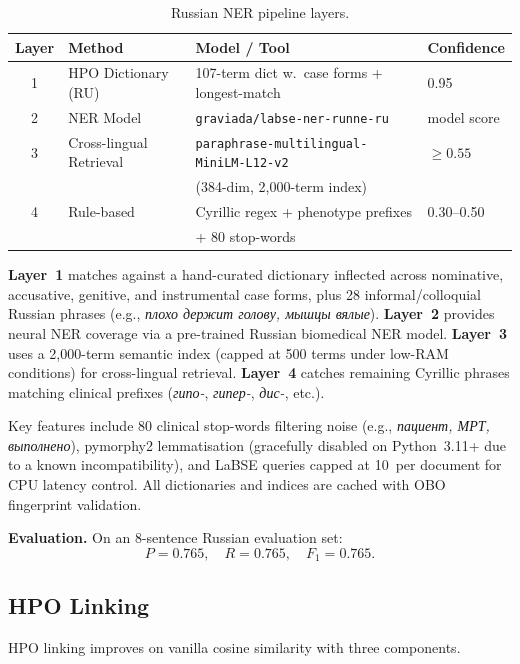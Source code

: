\documentclass[11pt,a4paper]{article}
\begin{document}
\begin{table}[H]
\centering
\caption{Russian NER pipeline layers.}
\label{tab:runerlayers}
\begin{tabular}{clll}
\toprule
\textbf{Layer} & \textbf{Method} & \textbf{Model / Tool} & \textbf{Confidence} \\
\midrule
1 & HPO Dictionary (RU) & 107-term dict w.\ case forms + longest-match & 0.95 \\
2 & NER Model & \texttt{graviada/labse-ner-runne-ru} & model score \\
3 & Cross-lingual Retrieval & \texttt{paraphrase-multilingual-MiniLM-L12-v2} & $\geq 0.55$ \\
  &                          & (384-dim, 2{,}000-term index) & \\
4 & Rule-based & Cyrillic regex + phenotype prefixes & 0.30--0.50 \\
  &            & + 80 stop-words & \\
\bottomrule
\end{tabular}
\end{table}

\textbf{Layer~1} matches against a hand-curated dictionary inflected across
nominative, accusative, genitive, and instrumental case forms, plus 28
informal/colloquial Russian phrases (e.g.,
\textit{плохо держит голову, мышцы вялые}).
\textbf{Layer~2} provides neural NER coverage via a pre-trained Russian
biomedical NER model.
\textbf{Layer~3} uses a 2{,}000-term semantic index (capped at 500 terms under
low-RAM conditions) for cross-lingual retrieval.
\textbf{Layer~4} catches remaining Cyrillic phrases matching clinical prefixes
(\textit{гипо-}, \textit{гипер-}, \textit{дис-}, etc.).

Key features include 80 clinical stop-words filtering noise (e.g.,
\textit{пациент, МРТ, выполнено}), pymorphy2 lemmatisation (gracefully disabled
on Python~3.11+ due to a known incompatibility), and LaBSE queries capped at
10~per document for CPU latency control.  All dictionaries and indices are
cached with OBO fingerprint validation.

\textbf{Evaluation.}  On an 8-sentence Russian evaluation set:
\[
  P = 0.765, \quad R = 0.765, \quad F_1 = 0.765.
\]

\subsection{HPO Linking}

HPO linking improves on vanilla cosine similarity with three components.
\end{document}
